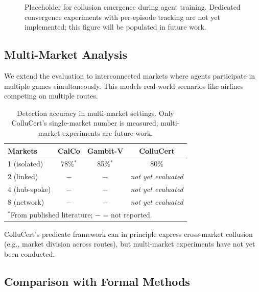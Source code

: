 \documentclass[11pt]{article}
\begin{document}
\begin{figure}[t]
\centering
{}
\caption{Placeholder for collusion emergence during agent training. Dedicated convergence experiments with per-episode tracking are not yet implemented; this figure will be populated in future work.}
\end{figure}

\subsection{Multi-Market Analysis}

We extend the evaluation to interconnected markets where agents participate in multiple games simultaneously. This models real-world scenarios like airlines competing on multiple routes.

\begin{table}[t]
\centering
\caption{Detection accuracy in multi-market settings. Only ColluCert's single-market number is measured; multi-market experiments are future work.}
\begin{tabular}{lccc}
\toprule
\textbf{Markets} & \textbf{CalCo} & \textbf{Gambit-V} & \textbf{ColluCert} \\
\midrule
1 (isolated) & 78\%$^*$ & 85\%$^*$ & 80\% \\
2 (linked) & $-$ & $-$ & \emph{not yet evaluated} \\
4 (hub-spoke) & $-$ & $-$ & \emph{not yet evaluated} \\
8 (network) & $-$ & $-$ & \emph{not yet evaluated} \\
\bottomrule
\multicolumn{4}{l}{\footnotesize $^*$From published literature; $-$ = not reported.}
\end{tabular}
\end{table}

ColluCert's predicate framework can in principle express cross-market collusion (e.g., market division across routes), but multi-market experiments have not yet been conducted. \subsection{Comparison with Formal Methods}
\end{document}
